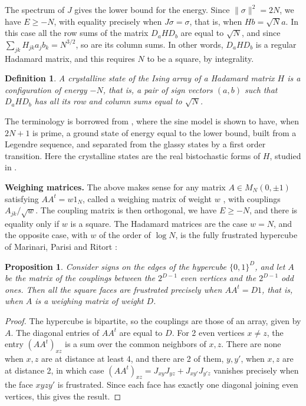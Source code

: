 \documentclass[11pt,a4paper]{article}
\newtheorem{prop}[thm]{Proposition}
\newtheorem{defn}[thm]{Definition}
\theoremstyle{remark}
\begin{document}
The spectrum of $J$ gives the lower bound for the energy. Since $\|\sigma\|^2=2N$, we have $E\geq-N$, with equality precisely when $J\sigma=\sigma$, that is, when $Hb=\sqrt Na$. In this case all the row sums of the matrix $D_aHD_b$ are equal to $\sqrt N$, and since $\sum_{jk}H_{jk}a_jb_k=N^{3/2}$, so are its column sums. In other words, $D_aHD_b$ is a regular Hadamard matrix, and this requires $N$ to be a square, by integrality.

\begin{samepage}
\begin{defn}
A crystalline state of the Ising array of a Hadamard matrix $H$ is a configuration of energy $-N$, that is, a pair of sign vectors $(a,b)$ such that $D_aHD_b$ has all its row and column sums equal to $\sqrt N$.
\end{defn}
\end{samepage}

The terminology is borrowed from \cite{mp2}, where the sine model is shown to have, when $2N+1$ is prime, a ground state of energy equal to the lower bound, built from a Legendre sequence, and separated from the glassy states by a first order transition. Here the crystalline states are the real bistochastic forms of $H$, studied in \cite{com}.

\medskip

\noindent\textbf{Weighing matrices.} The above makes sense for any matrix $A\in M_N(0,\pm1)$ satisfying $AA^t=w1_N$, called a weighing matrix of weight $w$ \cite{gse}, with couplings $A_{jk}/\sqrt w$. The coupling matrix is then orthogonal, we have $E\geq-N$, and there is equality only if $w$ is a square. The Hadamard matrices are the case $w=N$, and the opposite case, with $w$ of the order of $\log N$, is the fully frustrated hypercube of Marinari, Parisi and Ritort \cite{mp3}:

\begin{samepage}
\begin{prop}\label{prop:hypercube}
Consider signs on the edges of the hypercube $\{0,1\}^D$, and let $A$ be the matrix of the couplings between the $2^{D-1}$ even vertices and the $2^{D-1}$ odd ones. Then all the square faces are frustrated precisely when $AA^t=D1$, that is, when $A$ is a weighing matrix of weight $D$.
\end{prop}
\end{samepage}

\begin{proof}
The hypercube is bipartite, so the couplings are those of an array, given by $A$. The diagonal entries of $AA^t$ are equal to $D$. For 2 even vertices $x\neq z$, the entry $(AA^t)_{xz}$ is a sum over the common neighbors of $x,z$. There are none when $x,z$ are at distance at least 4, and there are 2 of them, $y,y'$, when $x,z$ are at distance 2, in which case $(AA^t)_{xz}=J_{xy}J_{yz}+J_{xy'}J_{y'z}$ vanishes precisely when the face $xyzy'$ is frustrated. Since each face has exactly one diagonal joining even vertices, this gives the result.
\end{proof}
\end{document}
